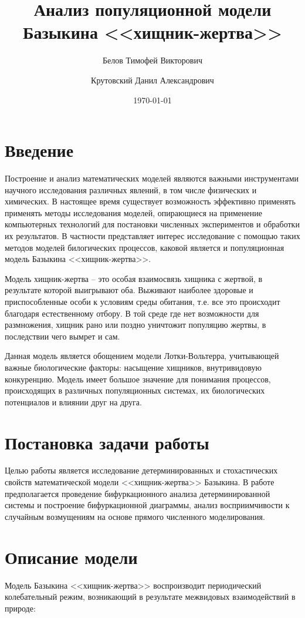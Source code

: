 \documentclass[a4paper,14pt]{extarticle}
\title{Анализ популяционной модели Базыкина <<хищник-жертва>>}
\author{ Белов Тимофей Викторович \and Крутовский Данил Александрович }
\date{\today}
\begin{document}
\maketitle

\newpage
\tableofcontents

\newpage
\section{Введение}
Построение и анализ математических моделей являются важными инструментами научного исследования различных явлений, в том числе физических и  химических. В настоящее время существует возможность эффективно применять применять методы исследования моделей, опирающиеся на применение компьютерных технологий для постановки численных экспериментов и обработки их результатов. 
В частности представляет интерес исследование с помощью таких методов моделей билогических процессов, каковой является и популяционная модель Базыкина <<хищник-жертва>>. 

Модель хищник-жертва – это особая взаимосвязь хищника с жертвой, в результате которой выигрывают оба. Выживают наиболее здоровые и приспособленные особи к условиям среды обитания, т.е. все это происходит благодаря естественному отбору.
В той среде где нет возможности для размножения, хищник рано или поздно уничтожит популяцию жертвы, в последствии чего вымрет и сам.

Данная модель является обощением модели Лотки-Вольтерра, учитывающей важные биологические факторы: насыщение хищников, внутривидовую конкуренцию. Модель имеет большое значение для понимания процессов, происходящих в различных популяционных системах, их биологических потенциалов и влиянии друг на друга.


\section{Постановка задачи работы}
Целью работы является исследование детерминированных и стохастических свойств математической модели <<хищник-жертва>> Базыкина. В работе предполагается проведение бифуркационного анализа детерминированной системы и построение бифуркационной диаграммы, анализ восприимчивости к случайным возмущениям на основе прямого численного моделирования.

\section{Описание модели}
 Модель Базыкина <<хищник-жертва>> воспроизводит периодический колебательный режим, возникающий в результате межвидовых взаимодействий в природе:
\end{document}
